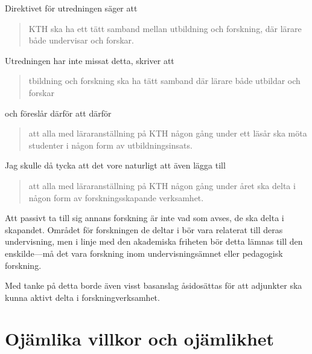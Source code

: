 \documentclass[a4paper,oneside,article,swedish]{memoir}
\let\section\chapter
\begin{document}
Direktivet för utredningen säger att
\blockcquote[s.~1]{direktiv}{%
  KTH ska ha ett tätt samband mellan utbildning och forskning, där lärare både 
  undervisar och forskar.%
}
Utredningen har inte missat detta, \textcite{utredning} skriver att
\blockcquote[s.~2]{utredning}{%
  tbildning och forskning ska ha tätt samband där lärare både 
  utbildar och forskar%
}
och föreslår därför att därför
\blockcquote[s-~2]{utredning}{%
  att alla med läraranställning på KTH någon gång under ett läsår ska möta 
  studenter i någon form av utbildningsinsats.%
}

Jag skulle då tycka att det vore naturligt att även lägga till
\blockquote{%
  att alla med läraranställning på KTH någon gång under året ska delta i någon 
  form av forskningsskapande verksamhet.%
}
Att passivt ta till sig annans forskning är inte vad som avses, de ska delta i 
skapandet.
Området för forskningen de deltar i bör vara relaterat till deras undervisning, 
men i linje med den akademiska friheten bör detta lämnas till den enskilde---må 
det vara forskning inom undervisningsämnet eller pedagogisk forskning.

Med tanke på detta borde även visst basanslag åsidosättas för att adjunkter ska 
kunna aktivt delta i forskningverksamhet.


\section{Ojämlika villkor och 
ojämlikhet}\label{ForskandeAdjunkter}\label{OjämlikaVillkor}
\end{document}
